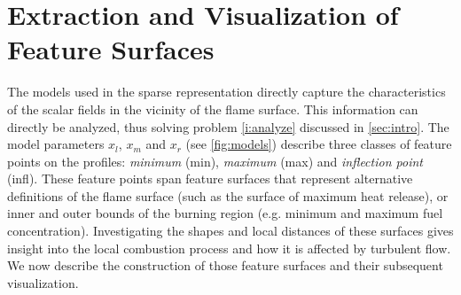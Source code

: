 
%
\section{Extraction and Visualization of Feature Surfaces}
\label{sec:visualization}
%
The models used in the sparse representation directly capture the
characteristics of the scalar fields in the vicinity of the flame surface. This
information can directly be analyzed, thus solving problem \ref{i:analyze}
discussed in \cref{sec:intro}. The model parameters $x_l$, $x_m$ and $x_r$ (see
\cref{fig:models}) describe three classes of feature points on the profiles:
\emph{minimum} (min), \emph{maximum} (max) and \emph{inflection point} (infl).
%
% 
These feature points span feature surfaces that represent alternative
definitions of the flame surface (such as the surface of maximum heat release),
or inner and outer bounds of the burning region (e.g. minimum and maximum fuel
concentration). Investigating the shapes and local distances of these surfaces
gives insight into the local combustion process and how it is affected
by turbulent flow. We now describe the construction of those feature surfaces
and their subsequent visualization.
%
%
%
%
